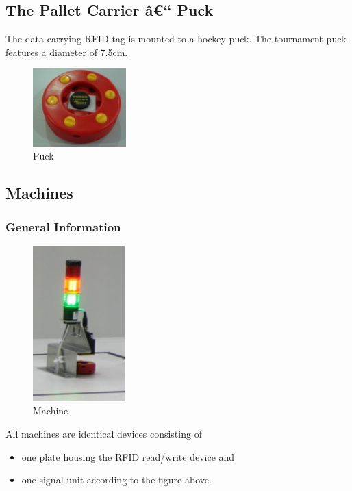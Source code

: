 \documentclass[12pt,twoside]{article}
\begin{document}
\subsection{The Pallet Carrier â€“ Puck}
The data carrying RFID tag is mounted to a hockey puck. The tournament
puck features a diameter of 7.5cm.

\begin{figure}[h!]
  \centering
  \includegraphics[height=3cm]{125px-Puck}
  \caption{Puck}
  \label{fig:puck}
\end{figure}

\subsection{Machines}
\label{sec:machines}

\subsubsection{General Information}

\begin{figure}[h]
  \centering
  \includegraphics[height=6cm]{Machine}
  \caption{Machine}
  \label{fig:machine}
\end{figure}

All machines are identical devices consisting of 
\begin{itemize}
\item one plate housing the RFID read/write device and
\item one signal unit according to the figure above.
\end{itemize}
\end{document}
